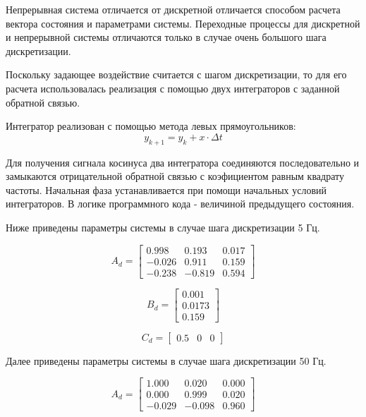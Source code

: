 \documentclass[14pt,a4paper]{extreport}
\begin{document}
Непрерывная система отличается от дискретной отличается способом 
расчета вектора состояния и параметрами системы. Переходные процессы для дискретной и непрерывной системы отличаются 
только в случае очень большого шага дискретизации.

Поскольку задающее воздействие считается с шагом дискретизации,
то для его расчета использовалась реализация с помощью двух интеграторов
с заданной обратной связью.

Интегратор реализован с помощью метода левых прямоугольников:
\begin{equation}
    y_{k+1} = y_{k} + x \cdot \Delta t
\end{equation}

Для получения сигнала косинуса два интегратора 
соединяются последовательно и замыкаются отрицательной обратной связью
с коэфициентом равным квадрату частоты. Начальная фаза устанавливается
при помощи начальных условий интеграторов. В логике программного кода - 
величиной предыдущего состояния.

Ниже приведены параметры системы в случае шага дискретизации 5 Гц.

\begin{equation}
    A_{d} = 
    \begin{bmatrix} 
        0.998 & 0.193 & 0.017 \\ 
        -0.026 & 0.911 & 0.159 \\
        -0.238 & -0.819 & 0.594
    \end{bmatrix}
\end{equation}

\begin{equation}
    B_{d} = 
    \begin{bmatrix} 
        0.001 \\ 
        0.0173 \\
        0.159
    \end{bmatrix}
\end{equation}

\begin{equation}
    C_{d} = 
    \begin{bmatrix} 
        0.5 & 0 & 0
    \end{bmatrix}
\end{equation}

Далее приведены параметры системы в случае шага дискретизации 50 Гц.

\begin{equation}
    A_{d} = 
    \begin{bmatrix} 
        1.000 & 0.020 & 0.000 \\ 
        0.000 & 0.999 & 0.020 \\
        -0.029 & -0.098 & 0.960
    \end{bmatrix}
\end{equation}
\end{document}
